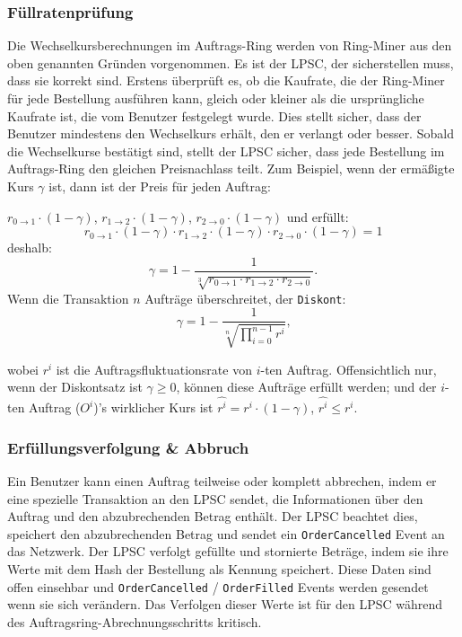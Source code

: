 \documentclass[UTF8,nofonts]{article}
\begin{document}
\begin{multicols}{2}
\subsubsection{Füllratenprüfung\label{sec:fill_rate_check}}

Die Wechselkursberechnungen im Auftrags-Ring werden von Ring-Miner aus den oben genannten Gründen vorgenommen. Es ist der LPSC, der sicherstellen muss, dass sie korrekt sind. Erstens überprüft es, ob die Kaufrate, die der Ring-Miner für jede Bestellung ausführen kann, gleich oder kleiner als die ursprüngliche Kaufrate ist, die vom Benutzer festgelegt wurde. Dies stellt sicher, dass der Benutzer mindestens den Wechselkurs erhält, den er verlangt oder besser. Sobald die Wechselkurse bestätigt sind, stellt der LPSC sicher, dass jede Bestellung im Auftrags-Ring den gleichen Preisnachlass teilt. Zum Beispiel, wenn der ermäßigte Kurs $\gamma$ ist, dann ist der Preis für jeden Auftrag: 

$r_{0\rightarrow 1} \cdot (1-\gamma)$, $r_{1\rightarrow 2} \cdot (1-\gamma)$, $r_{2 \rightarrow 0} \cdot (1-\gamma)$ und erfüllt:  
\begin{equation}
r_{0\rightarrow 1} \cdot (1-\gamma)\cdot r_{1\rightarrow 2} \cdot (1-\gamma) \cdot r_{2 \rightarrow 0} \cdot (1-\gamma) = 1
\end{equation}
deshalb:
\begin{equation}
\gamma = 1- \frac{1}{\sqrt[3]{r_{0\rightarrow 1} \cdot r_{1\rightarrow 2} \cdot r_{2\rightarrow 0}}}\text{.}
\end{equation}
Wenn die Transaktion $n$ Aufträge überschreitet, der \texttt{Diskont}: 
\begin{equation}
\gamma = 1- \frac{1}{\sqrt[n]{\prod_{i=0}^{n-1} r^i}} \text{,}
\end{equation}

wobei $r^i$ ist die Auftragsfluktuationsrate von $i$-ten Auftrag. Offensichtlich nur, wenn der Diskontsatz ist $\gamma \ge 0$, können diese Aufträge erfüllt werden; und der $i$-ten Auftrag ($O^i$)'s wirklicher Kurs ist $\hat{r^i} = r^i \cdot (1-\gamma)$, $\hat{r^i}\le r^i$.


\subsubsection{Erfüllungsverfolgung \& Abbruch}

Ein Benutzer kann einen Auftrag teilweise oder komplett abbrechen, indem er eine spezielle Transaktion an den LPSC sendet, die Informationen über den Auftrag und den abzubrechenden Betrag enthält. Der LPSC beachtet dies, speichert den abzubrechenden Betrag und sendet ein \verb|OrderCancelled| Event an das Netzwerk. Der LPSC verfolgt gefüllte und stornierte Beträge, indem sie ihre Werte mit dem Hash der Bestellung als Kennung speichert. Diese Daten sind offen einsehbar und \verb|OrderCancelled| / \verb|OrderFilled| Events werden gesendet wenn sie sich verändern. Das Verfolgen dieser Werte ist für den LPSC während des Auftragsring-Abrechnungsschritts kritisch.


\end{multicols}
\end{document}
